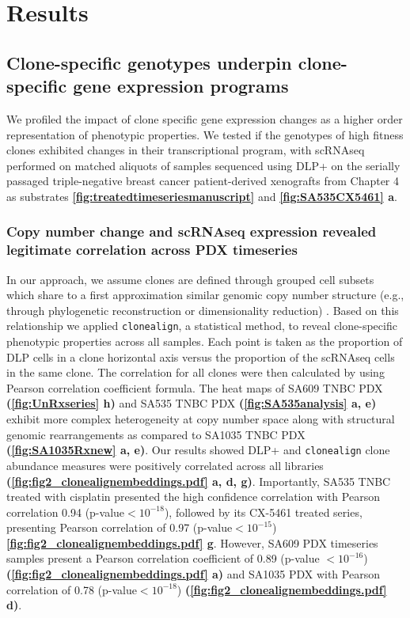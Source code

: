 \section{Results}

\subsection{Clone-specific genotypes underpin clone-specific gene expression programs}
We profiled the impact of clone specific gene expression changes as a higher order representation of phenotypic properties. We tested if the genotypes of high fitness clones exhibited changes in their transcriptional program, with scRNAseq performed on matched aliquots of samples sequenced using DLP+ on the serially passaged triple-negative breast cancer patient-derived xenografts from Chapter 4 as substrates \textbf{\autoref{fig:treatedtimeseriesmanuscript}} and \textbf{\autoref{fig:SA535CX5461} a}.

\subsubsection{Copy number change and scRNAseq expression revealed legitimate correlation across PDX timeseries}
  In our approach, we assume clones are defined through grouped cell subsets which share to a first approximation similar genomic copy number structure (e.g., through phylogenetic reconstruction or dimensionality reduction) \cite{laks2019clonal}. Based on this relationship we applied
  \texttt{clonealign}, a statistical method, \cite{campbell2019clonealign} to reveal clone-specific phenotypic properties across all samples.
  Each point is taken as the proportion of DLP cells in a clone horizontal axis versus the proportion of the scRNAseq cells in the same clone. The  correlation for all clones were then calculated by using Pearson correlation coefficient formula. The heat maps of SA609 TNBC PDX \textbf{(\autoref{fig:UnRxseries} h)} and SA535 TNBC PDX \textbf{(\autoref{fig:SA535analysis} a, e)} exhibit more complex heterogeneity at copy number space along with structural genomic rearrangements as compared to SA1035 TNBC PDX \textbf{(\autoref{fig:SA1035Rxnew} a, e)}. Our results showed DLP+ and \texttt{clonealign} clone abundance measures were positively correlated across all libraries \textbf{(\autoref{fig:fig2_clonealignembeddings.pdf} a, d, g)}. Importantly, SA535 TNBC treated with cisplatin presented the high confidence correlation with Pearson correlation 0.94 (p-value$< 10^{-18}$), followed by its CX-5461 treated series, presenting Pearson correlation of 0.97 (p-value$< 10^{-15}$) \textbf{\autoref{fig:fig2_clonealignembeddings.pdf} g}. However, SA609 PDX timeseries samples present a Pearson correlation coefficient of 0.89 (p-value $< 10^{-16}$) \textbf{(\autoref{fig:fig2_clonealignembeddings.pdf} a)} and SA1035 PDX with Pearson correlation of 0.78 (p-value$< 10^{-18}$) \textbf{(\autoref{fig:fig2_clonealignembeddings.pdf} d)}.
  
